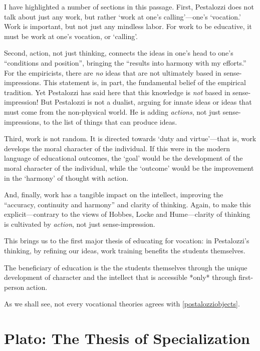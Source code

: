 I have highlighted a number of sections in this passage. First, Pestalozzi does not talk about just any work, but rather `work at one's calling'---one's `vocation.' Work is important, but not just any mindless labor. For work to be educative, it must be work at one's vocation, or `calling'.

Second, action, not just thinking, connects the ideas in one's head to one's ``conditions and position'', bringing the ``results into harmony with my efforts.'' For the empiricists, there are \emph{no} ideas that are not ultimately based in sense-impressions. This statement is, in part, the fundamental belief of the empirical tradition. Yet Pestalozzi has said here that this knowledge is \emph{not} based in sense-impression! But Pestalozzi is not a dualist, arguing for innate ideas or ideas that must come from the non-physical world. He is adding \emph{actions}, not just sense-impressions, to the list of things that can produce ideas.

Third, work is not random. It is directed towards `duty and virtue'---that is, work develops the moral character of the individual. If this were in the modern language of educational outcomes, the `goal' would be the development of the moral character of the individual, while the `outcome' would be the improvement in the `harmony' of thought with action.

And, finally, work has a tangible impact on the intellect, improving the ``accuracy, continuity and harmony'' and clarity of thinking. Again, to make this explicit---contrary to the views of Hobbes, Locke and Hume---clarity of thinking is cultivated by \emph{action}, not just sense-impression.

This brings us to the first major thesis of educating for vocation: in Pestalozzi's thinking, by refining our ideas, work training benefits the students themselves.\begin{objects}
\label{pestalozziobjects}The beneficiary of education is the the students themselves through the unique development of character and the intellect that is accessible *only* through first-person action.
\end{objects}


As we shall see, not every vocational theories agrees with \ref{postalozziobjects}.

\section{Plato: The Thesis of Specialization}
\label{plato:thethesisofspecialization}

